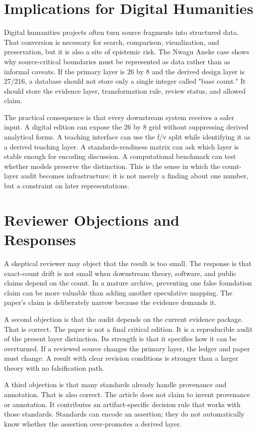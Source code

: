 \documentclass[sigconf,nonacm]{acmart}
\begin{document}
\section{Implications for Digital Humanities}
Digital humanities projects often turn source fragments into structured data.
That conversion is necessary for search, comparison, visualization, and
preservation, but it is also a site of epistemic risk. The Nwagu Aneke case
shows why source-critical boundaries must be represented as data rather than as
informal caveats. If the primary layer is 26 by 8 and the derived design layer
is 27/216, a database should not store only a single integer called "base
count." It should store the evidence layer, transformation rule, review status,
and allowed claim.

The practical consequence is that every downstream system receives a safer
input. A digital edition can expose the 26 by 8 grid without suppressing derived
analytical forms. A teaching interface can use the f/v split while identifying
it as a derived teaching layer. A standards-readiness matrix can ask which layer
is stable enough for encoding discussion. A computational benchmark can test
whether models preserve the distinction. This is the sense in which the
count-layer audit becomes infrastructure: it is not merely a finding about one
number, but a constraint on later representations.

\section{Reviewer Objections and Responses}
A skeptical reviewer may object that the result is too small. The response is
that exact-count drift is not small when downstream theory, software, and public
claims depend on the count. In a mature archive, preventing one false foundation
claim can be more valuable than adding another speculative mapping. The paper's
claim is deliberately narrow because the evidence demands it.

A second objection is that the audit depends on the current evidence package.
That is correct. The paper is not a final critical edition. It is a reproducible
audit of the present layer distinction. Its strength is that it specifies how it
can be overturned. If a reviewed source changes the primary layer, the ledger
and paper must change. A result with clear revision conditions is stronger than
a larger theory with no falsification path.

A third objection is that many standards already handle provenance and
annotation. That is also correct. The article does not claim to invent
provenance or annotation. It contributes an artifact-specific decision rule that
works with those standards. Standards can encode an assertion; they do not
automatically know whether the assertion over-promotes a derived layer.
\end{document}
